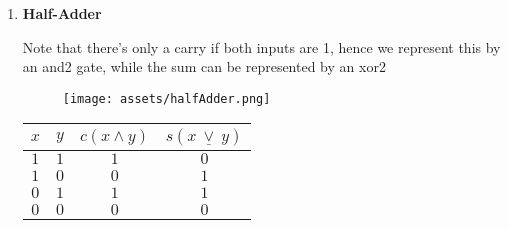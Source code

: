 \documentclass[english,course]{Notes}
\begin{document}
{\begin{enumerate}
	\begin{minipage}{\linewidth}
      \centering
      \begin{minipage}{0.45\linewidth}
          \begin{figure}[H]
              \texttt{[image: assets/mux.png]}
          \end{figure}
      \end{minipage}
      \hspace{0.05\linewidth}
      \begin{minipage}{0.45\linewidth}
      \begin{tabular}{|c|c|c|c|}
		$c$ & $x$ & $y$ & $z$  \\
		\hline
		$1$ & $1$ & $1$ & $1$ \\
		$1$ & $1$ & $0$ & $0$ \\
		$1$ & $0$ & $1$ & $1$ \\
		$1$ & $0$ & $0$ & $0$ \\ 
		$0$ & $1$ & $1$ & $1$ \\ 
		$0$ & $1$ & $0$ & $1$ \\
		$0$ & $0$ & $1$ & $0$ \\ 
		$0$ & $0$ & $0$ & $0$ \\
	\end{tabular}
	\end{minipage}
\end{minipage}
	
\newpage
	\item \textbf{Half-Adder}
	
	
	\par{Note that there's only a carry if both inputs are 1, hence we represent this by an and2 gate, while the sum can be represented by an xor2}
	
	\begin{minipage}{\linewidth}
      \centering
      \begin{minipage}{0.45\linewidth}
          \begin{figure}[H]
              \texttt{[image: assets/halfAdder.png]}
          \end{figure}
      \end{minipage}
      \hspace{0.05\linewidth}
      \begin{minipage}{0.45\linewidth}
      \begin{tabular}{|c|c|c|c|}
		$x$ & $y$ & $c (x \land y)$ & $s (x \ \underline{\lor}  \ y)$  \\
		\hline
		$1$ & $1$ & $1$ & $0$ \\
		$1$ & $0$ & $0$ & $1$ \\
		$0$ & $1$ & $1$ & $1$ \\
		$0$ & $0$ & $0$ & $0$ \\ 
	\end{tabular}
	\end{minipage}
	

\end{minipage}
\end{enumerate}}
\end{document}
